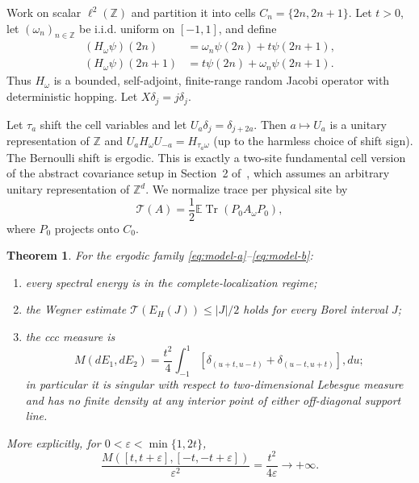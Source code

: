 \documentclass[10pt]{article}
\newtheorem{theorem}{Theorem}
\newcommand{\E}{\mathbb E}
\newcommand{\Z}{\mathbb Z}
\begin{document}
Work on scalar $\ell^2(\Z)$ and partition it into cells
$C_n=\{2n,2n+1\}$. Let $t>0$, let $(\omega_n)_{n\in\Z}$ be i.i.d. uniform on
$[-1,1]$, and define
\begin{align}
 (H_\omega\psi)(2n)&=\omega_n\psi(2n)+t\psi(2n+1),\label{eq:model-a}\\
 (H_\omega\psi)(2n+1)&=t\psi(2n)+\omega_n\psi(2n+1).\label{eq:model-b}
\end{align}
Thus $H_\omega$ is a bounded, self-adjoint, finite-range random Jacobi
operator with deterministic hopping. Let $X\delta_j=j\delta_j$.

Let $\tau_a$ shift the cell variables and let $U_a\delta_j=\delta_{j+2a}$.
Then $a\mapsto U_a$ is a unitary representation of $\Z$ and
$U_aH_\omega U_{-a}=H_{\tau_a\omega}$ (up to the harmless choice of shift
sign). The Bernoulli shift is ergodic. This is exactly a two-site fundamental
cell version of the abstract covariance setup in Section~2 of~\cite{cgh},
which assumes an arbitrary unitary representation of $\Z^d$. We normalize
trace per physical site by
\begin{equation}\label{eq:trace}
 \mathcal T(A)=\frac12\E\operatorname{Tr}(P_0A_\omega P_0),
\end{equation}
where $P_0$ projects onto $C_0$.

\begin{theorem}\label{thm:main}
For the ergodic family \eqref{eq:model-a}--\eqref{eq:model-b}:
\begin{enumerate}
\item every spectral energy is in the complete-localization regime;
\item the Wegner estimate $\mathcal T(E_H(J))\le |J|/2$ holds for every Borel
interval $J$;
\item the ccc measure is
\begin{equation}\label{eq:ccc-formula}
 M(dE_1,dE_2)=\frac{t^2}{4}\int_{-1}^{1}
 \left[\delta_{(u+t,u-t)}+\delta_{(u-t,u+t)}\right],du;
\end{equation}
in particular it is singular with respect to two-dimensional Lebesgue measure
and has no finite density at any interior point of either off-diagonal support
line.
\end{enumerate}
More explicitly, for $0<\varepsilon<\min\{1,2t\}$,
\begin{equation}\label{eq:blowup}
 \frac{M([t,t+\varepsilon],[-t,-t+\varepsilon])}{\varepsilon^2}
 =\frac{t^2}{4\varepsilon}\longrightarrow+\infty.
\end{equation}
\end{theorem}
\end{document}

